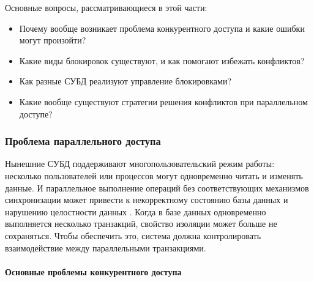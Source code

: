 Основные вопросы, рассматривающиеся в этой части:
\begin{itemize}
		\item Почему вообще возникает проблема конкурентного доступа и какие ошибки могут произойти?
		\item Какие виды блокировок существуют, и как помогают избежать конфликтов?
    \item Как разные СУБД реализуют управление блокировками?
    \item Какие вообще существуют стратегии решения конфликтов при параллельном доступе?
\end{itemize}

\subsubsection{Проблема параллельного доступа}

Нынешние СУБД поддерживают многопользовательский режим работы: несколько пользователей или процессов могут одновременно читать и изменять данные. И параллельное выполнение операций без соответствующих механизмов синхронизации может привести к некорректному состоянию базы данных и нарушению целостности данных \autocite{ElmasriNavathe, Silberschatz}.
Когда в базе данных одновременно выполняется несколько транзакций, свойство изоляции может больше не сохраняться. Чтобы обеспечить это, система должна контролировать взаимодействие между параллельными транзакциями. \autocite{Silberschatz}

\paragraph{Основные проблемы конкурентного доступа} ~\\

